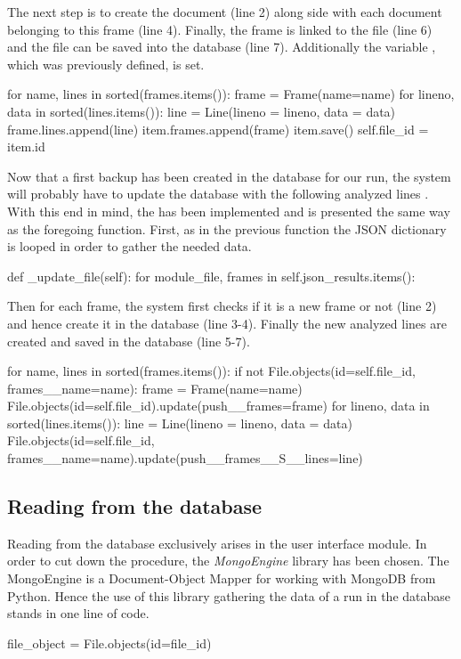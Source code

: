The next step is to create the  document (line 2) along side with each  document belonging to this frame (line 4). Finally, the frame is linked to the file (line 6) and the file can be saved into the database (line 7). Additionally the variable , which was previously defined, is set.
\begin{python}
for name, lines in sorted(frames.items()):
    frame = Frame(name=name)
    for lineno, data in sorted(lines.items()):
        line = Line(lineno = lineno, data = data)
        frame.lines.append(line)
    item.frames.append(frame)
    item.save()
self.file_id = item.id
\end{python}

Now that a first backup has been created in the database for our run, the system will probably have to update the database with the following analyzed lines . With this end in mind, the  has been implemented and is presented the same way as the foregoing function. First, as in the previous function the JSON dictionary is looped in order to gather the needed data.
\begin{python}
def _update_file(self):
  for module_file, frames in self.json_results.items():
\end{python}

Then for each frame, the system first checks if it is a new frame or not (line 2) and hence create it in the database (line 3-4). Finally the new analyzed lines are created and saved in the database (line 5-7).
\begin{python}
for name, lines in sorted(frames.items()):
    if not File.objects(id=self.file_id, frames__name=name):
        frame = Frame(name=name)
        File.objects(id=self.file_id).update(push__frames=frame)
    for lineno, data in sorted(lines.items()):
        line = Line(lineno = lineno, data = data)
        File.objects(id=self.file_id, frames__name=name).update(push__frames__S__lines=line)
\end{python}

\subsection{Reading from the database}

Reading from the database exclusively arises in the user interface module. In order to cut down the procedure, the \textit{MongoEngine} library has been chosen. The MongoEngine is a Document-Object Mapper for working with MongoDB from Python. Hence the use of this library gathering the data of a run in the database stands in one line of code.
\begin{python}
file_object = File.objects(id=file_id)
\end{python} 

